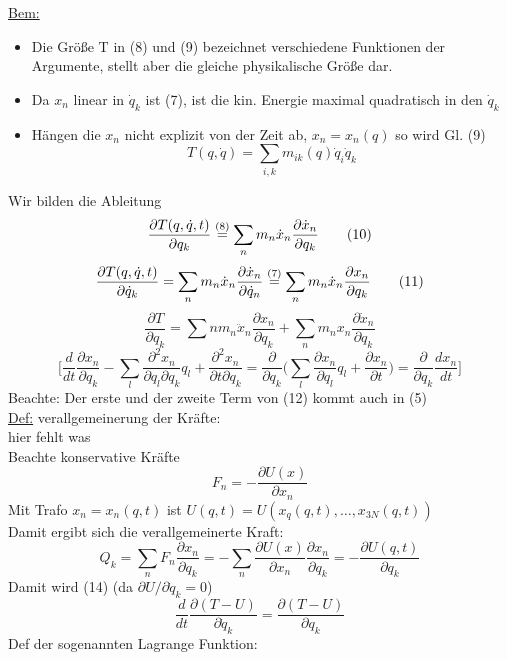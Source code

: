 \documentclass[titlepage,12pt,a4paper,ngerman]{report}
\begin{document}
\underline{Bem:} \begin{itemize}
	\item Die Größe T in (8) und (9) bezeichnet verschiedene Funktionen der Argumente, stellt aber die gleiche physikalische Größe dar.
	\item Da $ x_n $ linear in $ \dot{q}_k $ ist (7), ist die kin. Energie maximal quadratisch in den $ \dot{q}_k $
	\item Hängen die $ x_n $ nicht explizit von der Zeit ab, $ x_n = x_n (q) $ so wird Gl. (9)
	$$ T ( q, \dot{q}) = \sum_{i,k} m_{ik} (q) \dot{q}_i \dot{q}_k$$
\end{itemize}
Wir bilden die Ableitung
\begin{equation*}
\frac{\partial T(q,\dot{q},t)}{\partial q_k} \buildrel (8) \over = \sum_n m_n \dot{x}_n \frac{\partial \dot{x}_n}{\partial q_k} \tag{10}
\end{equation*}
\begin{equation*}
\frac{\partial T(q,\dot{q},t)}{\partial \dot{q}_k} = \sum_n m_n \dot{x}_n \frac{\partial \dot{x}_n}{\partial \dot{q}_n} \buildrel (7) \over = \sum_n m_n \dot{x}_n \frac{\partial  x_n}{\partial q_k} \tag{11}
\end{equation*}
\begin{equation*}
\frac{\partial T}{\partial q_k} = \sum n m_n \ddot{x}_n \frac{\partial x_n}{\partial q_k} + \sum_n m_n x_n \frac{\partial \dot{x}_n}{\partial q_k} \tag{12}
\end{equation*}
$$ \bigg[ \frac{d}{dt} \frac{\partial x_n}{\partial q_k} - \sum_l \frac{\partial^2 x_n}{\partial q_l \partial q_k } q_l + \frac{\partial^2 x_n}{\partial t \partial q_k} = \frac{\partial}{\partial q_k} \bigg( \sum_l \frac{\partial x_n}{\partial q_l} q_l + \frac{\partial x_n}{\partial t} \bigg) = \frac{\partial }{\partial q_k} \frac{d x_n}{dt} \bigg]$$
Beachte: Der erste und der zweite Term von (12) kommt auch in (5)\\
\underline{Def:} verallgemeinerung der Kräfte:\\

hier fehlt was\\


Beachte konservative Kräfte
$$ F_n = - \frac{\partial U(x)}{\partial x_n} $$
Mit Trafo $ x_n = x_n (q,t)  $ ist $ U(q,t) = U ( x_q(q,t),\dots , x_{3N} (q,t)) $\\
Damit ergibt sich die verallgemeinerte Kraft:
\begin{equation*}
Q_k = \sum_n F_n \frac{\partial x_n}{\partial q_k} = - \sum_n \frac{\partial U(x)}{\partial x_n} \frac{\partial x_n}{\partial q_k} = - \frac{\partial U(q,t)}{\partial q_k} \tag{15}
\end{equation*}
Damit wird (14) (da $ \partial U / \partial \dot{q}_k = 0 $)
\begin{equation*}
\frac{d}{dt} \frac{\partial (T-U)}{\partial \dot{q}_k} = \frac{\partial (T-U)}{\partial q_k} \tag{16}
\end{equation*}
Def der sogenannten Lagrange Funktion:
\end{document}
